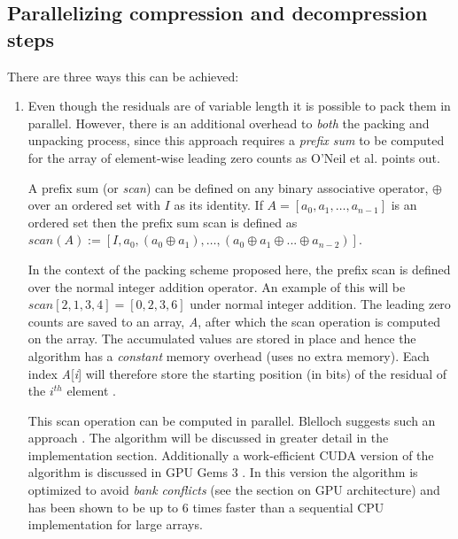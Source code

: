 \subsection{Parallelizing compression and decompression steps}
There are three ways this can be achieved: 
\begin{enumerate}
 \item Even though the residuals are of variable length it is possible to pack them in parallel. However, there is an additional overhead to \textit{both} the packing and 
 unpacking process, since this approach requires a \textit{prefix sum} to be computed for the array of element-wise leading zero counts as O'Neil et al. \cite{O'Neil:2011:FDC:1964179.1964189} 
 points out.
 
 A prefix sum (or \textit{scan}) can be defined on any binary associative operator, $\oplus$ over an ordered set with $I$ as its identity. If $A=[a_{0},a_{1},\dots,a_{n-1}]$ 
 is an ordered set then the prefix sum scan is defined as $scan(A):=[I,a_{0},(a_{0} \oplus a_{1}),\dots,(a_{0} \oplus a_{1} \oplus ... \oplus a_{n-2})]$. 
 
 In the context of the packing scheme proposed here, the prefix scan is defined over the normal integer addition operator. An example of this will be $scan[2,1,3,4] = [0,2,3,6]$ 
 under normal integer addition. The leading zero counts are saved to an array, \textit{A}, after which the scan operation is computed on the array. The accumulated values are 
 stored in place and hence the algorithm has a \textit{constant} memory overhead (uses no extra memory). Each index \textit{A}[\textit{i}] will therefore store the starting 
 position (in bits) of the residual of the $i^{th}$ element \cite{blelloch1990prefix}. 

 This scan operation can be computed in parallel. Blelloch suggests such an approach \cite{blelloch1990prefix}. The algorithm will be discussed in greater detail in the 
 implementation section. Additionally a work-efficient CUDA version of the algorithm is discussed in GPU Gems 3 \cite{harris2007parallel}. In this version the algorithm is 
 optimized to avoid \textit{bank conflicts} (see the section on GPU architecture) and has been shown to be up to 6 times faster than a sequential CPU implementation for large 
 arrays.
 

\end{enumerate}
